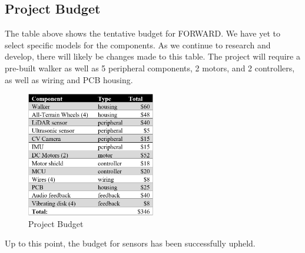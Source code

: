 \subsection{Project Budget}
\noindent The table above shows the tentative budget for FORWARD. We have yet to select specific models for the components. As we continue to research and develop, there will likely be changes made to this table. The project will require a pre-built walker as well as 5 peripheral components, 2 motors, and 2 controllers, as well as wiring and PCB housing. \\

\begin{figure}[H]
	\centering
	\includegraphics[width=0.5\textwidth]{./Images/Budget.png}
	\caption{\label{fig:Budget}Project Budget}
\end{figure}

\noindent Up to this point, the budget for sensors has been successfully upheld.\\

